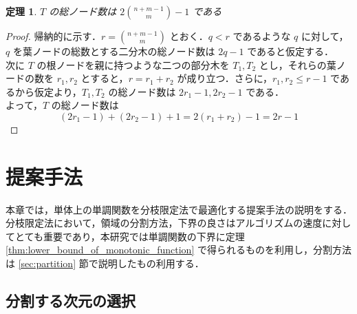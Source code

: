 \documentclass[a4paper,11pt]{jreport}
\newtheorem{theorem}{定理}
\begin{document}
\begin{theorem} \label{thm:total_node}
$ T $ の総ノード数は $ 2 \binom{n + m - 1}{m} - 1 $ である
\end{theorem}
\begin{proof}
帰納的に示す．$ r = \binom{n + m - 1}{m} $ とおく．$ q < r $ であるような $ q $ に対して，$ q $ を葉ノードの総数とする二分木の総ノード数は $ 2q - 1 $ であると仮定する．\\
次に $ T $ の根ノードを親に持つような二つの部分木を $ T_1, T_2 $ とし，それらの葉ノードの数を $ r_1, r_2 $ とすると，$ r = r_1 + r_2 $ が成り立つ．さらに，$ r_1, r_2 \leq r - 1 $ であるから仮定より，$ T_1, T_2 $ の総ノード数は $ 2r_1 - 1, 2r_2 - 1 $ である．\\
よって，$ T $ の総ノード数は
$$ (2r_1 - 1) + (2r_2 - 1) + 1 = 2(r_1 + r_2) - 1 = 2r - 1 $$
\end{proof}

\chapter{提案手法}

本章では，単体上の単調関数を分枝限定法で最適化する提案手法の説明をする．分枝限定法において，領域の分割方法，下界の良さはアルゴリズムの速度に対してとても重要であり，本研究では単調関数の下界に定理  \ref{thm:lower_bound_of_monotonic_function} で得られるものを利用し，分割方法は \ref{sec:partition} 節で説明したもの利用する．\par

\section{分割する次元の選択}
\end{document}
